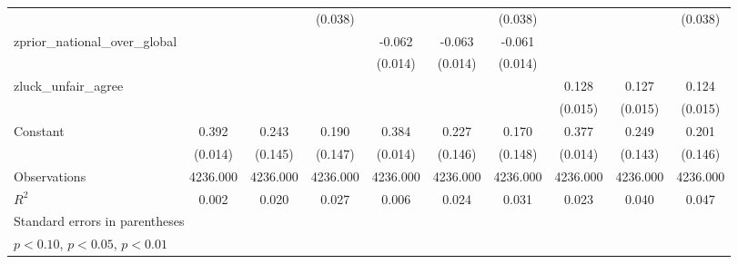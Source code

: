 {\begin{tabular}{l*{9}{c}}
                    &                     &                     &     (0.038)         &                     &                     &     (0.038)         &                     &                     &     (0.038)         \\
\addlinespace
zprior\_national\_over\_global&                     &                     &                     &      -0.062\sym{***}&      -0.063\sym{***}&      -0.061\sym{***}&                     &                     &                     \\
                    &                     &                     &                     &     (0.014)         &     (0.014)         &     (0.014)         &                     &                     &                     \\
\addlinespace
zluck\_unfair\_agree  &                     &                     &                     &                     &                     &                     &       0.128\sym{***}&       0.127\sym{***}&       0.124\sym{***}\\
                    &                     &                     &                     &                     &                     &                     &     (0.015)         &     (0.015)         &     (0.015)         \\
\addlinespace
Constant            &       0.392\sym{***}&       0.243\sym{*}  &       0.190         &       0.384\sym{***}&       0.227         &       0.170         &       0.377\sym{***}&       0.249\sym{*}  &       0.201         \\
                    &     (0.014)         &     (0.145)         &     (0.147)         &     (0.014)         &     (0.146)         &     (0.148)         &     (0.014)         &     (0.143)         &     (0.146)         \\
\midrule
Observations        &    4236.000         &    4236.000         &    4236.000         &    4236.000         &    4236.000         &    4236.000         &    4236.000         &    4236.000         &    4236.000         \\
\(R^{2}\)           &       0.002         &       0.020         &       0.027         &       0.006         &       0.024         &       0.031         &       0.023         &       0.040         &       0.047         \\
\bottomrule
\multicolumn{10}{l}{\footnotesize Standard errors in parentheses}\\
\multicolumn{10}{l}{\footnotesize \sym{*} \(p<0.10\), \sym{**} \(p<0.05\), \sym{***} \(p<0.01\)}\\
\end{tabular}
}
